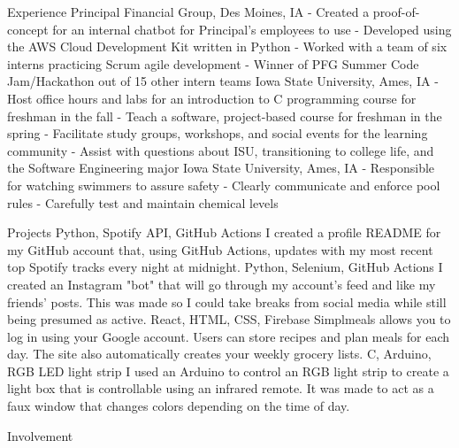 \documentclass[]{resume}
\begin{document}
\begin{topic}{Experience}
    {Principal Financial Group, Des Moines, IA}
    {
        - Created a proof-of-concept for an internal chatbot for Principal's employees to use \newline
        - Developed using the AWS Cloud Development Kit written in Python \newline
        - Worked with a team of six interns practicing Scrum agile development  \newline
        - Winner of PFG Summer Code Jam/Hackathon out of 15 other intern teams
    }
    {Iowa State University, Ames, IA}
    {
        - Host office hours and labs for an introduction to C programming course for freshman in the fall \newline
        - Teach a software, project-based course for freshman in the spring \newline
        - Facilitate study groups, workshops, and social events for the learning community \newline
        - Assist with questions about ISU, transitioning to college life, and the Software Engineering major
    }
    {Iowa State University, Ames, IA}
    {
        - Responsible for watching swimmers to assure safety \newline
        - Clearly communicate and enforce pool rules \newline
        - Carefully test and maintain chemical levels
    }\\
\end{topic}

\begin{topic}{Projects}
    {Python, Spotify API, GitHub Actions}
    {
        I created a profile README for my GitHub account that, using GitHub Actions, updates with my most recent top Spotify tracks every night at midnight.
    }
    {Python, Selenium, GitHub Actions}
    {
        I created an Instagram "bot" that will go through my account's feed and like my friends' posts. This was made so I could take breaks from social media while still being presumed as active.
    }
    {React, HTML, CSS, Firebase}
    {
        Simplmeals allows you to log in using your Google account. Users can store recipes and plan meals for each day. The site also automatically creates your weekly grocery lists.
    }
    {C, Arduino, RGB LED light strip}
    {
        I used an Arduino to control an RGB light strip to create a light box that is controllable using an infrared remote. It was made to act as a faux window that changes colors depending on the time of day.
    }\\
\end{topic}

\begin{topic}{Involvement}
\end{topic}
\end{document}

